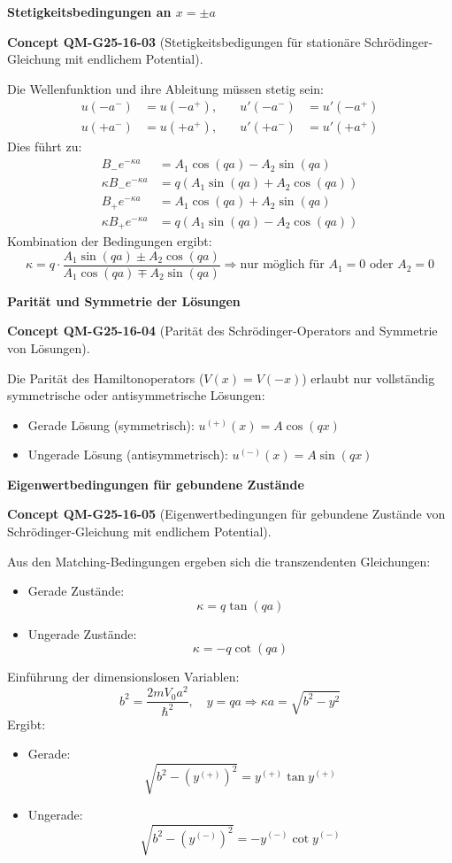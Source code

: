 \documentclass[10pt, letterpaper]{article}
\newcommand{\CustomHeading}[3]{%
  \par\medskip\noindent%
  \textbf{#1 #2} \textnormal{(#3)}.\enskip%
}
\newenvironment{CONC}[2]{\begin{unitbox}\CustomHeading{Concept}{#1}{#2}}{\end{unitbox}}
\begin{document}
\textbf{Stetigkeitsbedingungen an $x = \pm a$}

\begin{CONC}{QM-G25-16-03}{Stetigkeitsbedigungen für stationäre Schrödinger-Gleichung mit endlichem Potential}
Die Wellenfunktion und ihre Ableitung müssen stetig sein:
\[
\begin{aligned}
u(-a^-) &= u(-a^+), &\quad u'(-a^-) &= u'(-a^+) \\
u(+a^-) &= u(+a^+), &\quad u'(+a^-) &= u'(+a^+)
\end{aligned}
\]
Dies führt zu:
\[
\begin{aligned}
B_- e^{-\kappa a} &= A_1 \cos(qa) - A_2 \sin(qa) \\
\kappa B_- e^{-\kappa a} &= q (A_1 \sin(qa) + A_2 \cos(qa)) \\
B_+ e^{-\kappa a} &= A_1 \cos(qa) + A_2 \sin(qa) \\
\kappa B_+ e^{-\kappa a} &= q (A_1 \sin(qa) - A_2 \cos(qa))
\end{aligned}
\]
Kombination der Bedingungen ergibt:
\[
\kappa = q \cdot \frac{A_1 \sin(qa) \pm A_2 \cos(qa)}{A_1 \cos(qa) \mp A_2 \sin(qa)}
\Rightarrow \text{nur möglich für } A_1 = 0 \text{ oder } A_2 = 0
\]
\end{CONC}



\textbf{Parität und Symmetrie der Lösungen}

\begin{CONC}{QM-G25-16-04}{Parität des Schrödinger-Operators and Symmetrie von Lösungen}
Die Parität des Hamiltonoperators ($V(x) = V(-x)$) erlaubt nur vollständig symmetrische oder antisymmetrische Lösungen:
\begin{itemize}
\item Gerade Lösung (symmetrisch): \( u^{(+)}(x) = A \cos(qx) \)
\item Ungerade Lösung (antisymmetrisch): \( u^{(-)}(x) = A \sin(qx) \)
\end{itemize}
\end{CONC}



\textbf{Eigenwertbedingungen für gebundene Zustände}

\begin{CONC}{QM-G25-16-05}{Eigenwertbedingungen für gebundene Zustände von Schrödinger-Gleichung mit endlichem Potential}
Aus den Matching-Bedingungen ergeben sich die transzendenten Gleichungen:
\begin{itemize}
\item Gerade Zustände:
  \[
  \kappa = q \tan(qa)
  \]
\item Ungerade Zustände:
  \[
  \kappa = -q \cot(qa)
  \]
\end{itemize}
Einführung der dimensionslosen Variablen:
\[
b^2 = \frac{2m V_0 a^2}{\hbar^2}, \quad y = qa
\Rightarrow \kappa a = \sqrt{b^2 - y^2}
\]
Ergibt:
\begin{itemize}
\item Gerade:
  \[
  \sqrt{b^2 - (y^{(+)})^2} = y^{(+)} \tan y^{(+)}
  \]
\item Ungerade:
  \[
  \sqrt{b^2 - (y^{(-)})^2} = - y^{(-)} \cot y^{(-)}
  \]
\end{itemize}
\end{CONC}
\end{document}
